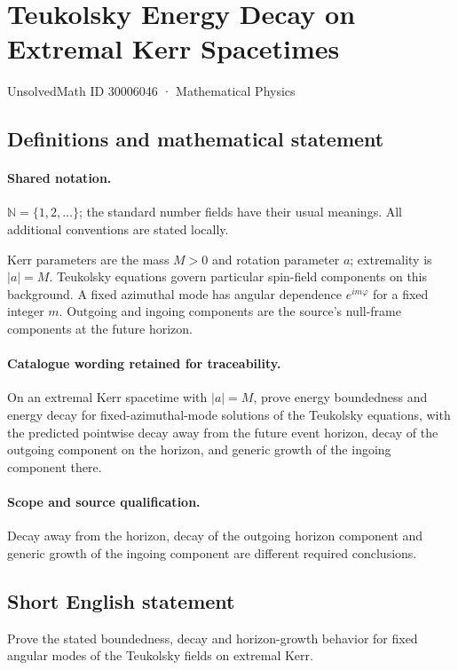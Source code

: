 \documentclass[11pt]{article}
\begin{document}
\setcounter{section}{30006045}
\section{Teukolsky Energy Decay on Extremal Kerr Spacetimes}\label{30006046}
{\small UnsolvedMath ID 30006046 · Mathematical Physics}
\subsection{Definitions and mathematical statement}

\paragraph{Shared notation.}$\mathbb N=\{1,2,\ldots\}$; the standard number fields have their usual meanings. All additional conventions are stated locally.


Kerr parameters are the mass $M>0$ and rotation parameter $a$; extremality is $|a|=M$. Teukolsky equations govern particular spin-field components on this background. A fixed azimuthal mode has angular dependence $e^{im\varphi}$ for a fixed integer $m$. Outgoing and ingoing components are the source's null-frame components at the future horizon.

\paragraph{Catalogue wording retained for traceability.}
On an extremal Kerr spacetime with $|a|=M$, prove energy boundedness and energy decay for fixed-azimuthal-mode solutions of the Teukolsky equations, with the predicted pointwise decay away from the future event horizon, decay of the outgoing component on the horizon, and generic growth of the ingoing component there.

\paragraph{Scope and source qualification.}Decay away from the horizon, decay of the outgoing horizon component and generic growth of the ingoing component are different required conclusions.
\subsection{Short English statement}
Prove the stated boundedness, decay and horizon-growth behavior for fixed angular modes of the Teukolsky fields on extremal Kerr.
\end{document}
